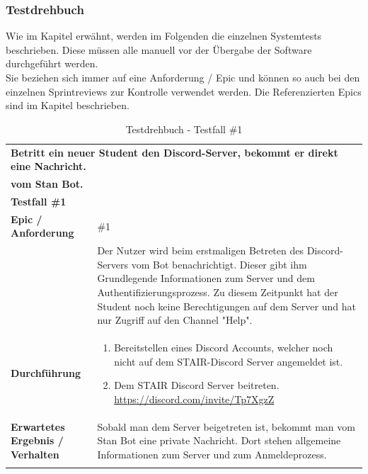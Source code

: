 \documentclass[a4paper, table]{article}
\begin{document}
\subsubsection{Testdrehbuch}\label{Testdrehbuch}
Wie im Kapitel  erwähnt, werden im Folgenden die einzelnen Systemtests beschrieben.
Diese müssen alle manuell vor der Übergabe der Software durchgeführt werden.\\
Sie beziehen sich immer auf eine Anforderung / Epic und können so auch bei den einzelnen Sprintreviews zur Kontrolle verwendet werden. 
Die Referenzierten Epics sind im Kapitel  beschrieben.

\begin{longtable}[ht]{|p{15em}|p{25em}|}
    \hline
    \multicolumn{2}{|l|}{\textbf{Betritt ein neuer Student den Discord-Server, bekommt er direkt eine Nachricht.}} \\*
    \multicolumn{2}{|l|}{\textbf{vom Stan Bot.}} \\
    \hline
    \multicolumn{2}{|l|}{\textbf{Testfall \#1}} \\
    \hline
    \textbf{Epic / Anforderung} & \#1 \\
     & Der Nutzer wird beim erstmaligen Betreten des Discord-Servers vom Bot benachrichtigt.
     Dieser gibt ihm Grundlegende Informationen zum Server und dem Authentifizierungsprozess.
     Zu diesem Zeitpunkt hat der Student noch keine Berechtigungen auf dem Server und
     hat nur Zugriff auf den Channel "Help". \\
    \hline
    \textbf{Durchführung} &
    \begin{enumerate}
        \item Bereitstellen eines Discord Accounts, welcher noch nicht auf dem STAIR-Discord Server angemeldet ist.
        \item Dem STAIR Discord Server beitreten. \url{https://discord.com/invite/Tp7XgzZ}
    \end{enumerate}\\
    \hline
    \textbf{Erwartetes Ergebnis / Verhalten} & Sobald man dem Server beigetreten ist, bekommt man vom Stan Bot eine private Nachricht.
    Dort stehen allgemeine Informationen zum Server und zum Anmeldeprozess. \\
    \hline
    \caption{Testdrehbuch - Testfall \#1}
\end{longtable}
\end{document}
